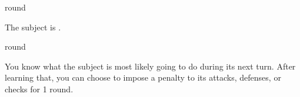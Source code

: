  round
\begin{spelleffect}
    The subject is \slowed.
\end{spelleffect}

 round
\begin{spelleffect}
    You know what the subject is most likely going to do during its next turn. After learning that, you can choose to impose a  penalty to its attacks, defenses, or checks for 1 round.
\end{spelleffect}
